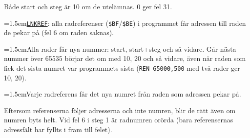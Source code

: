 \begin{Listing}
\Gap
{}
\Gap
{}
\Gap
{}
\begin{Note}\par\noindent Både start och steg är 10 om de utelämnas. 0 ger fel 31.\par
\par\noindent\hangindent=1.5em\hyperlink{l:LNKREF}{\texttt{LNKREF}}: alla radreferenser (\texttt{\$BF}/\texttt{\$BE}) i programmet får adressen till raden de pekar på (fel 6 om raden saknas).\par
\par\noindent\hangindent=1.5emAlla rader får nya nummer: start, start+steg och så vidare. Går nästa nummer över 65535 börjar det om med 10, 20 och så vidare, även när raden som fick det sista numret var programmets sista (\texttt{REN 65000,500} med två rader ger 10, 20).\par
\par\noindent\hangindent=1.5emVarje radreferens får det nya numret från raden som adressen pekar på.\par
\par\noindent Eftersom referenserna följer adresserna och inte numren, blir de rätt även om numren byts helt. Vid fel 6 i steg 1 är radnumren orörda (bara referensernas adressfält har fyllts i fram till felet).\par\end{Note}

\end{Listing}
